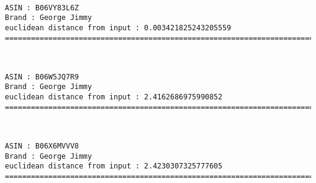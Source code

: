 \documentclass[11pt]{article}
\begin{document}
    
    
    \begin{center}
    \end{center}
    { \hspace*{\fill} \\}
    
    \begin{Verbatim}[commandchars=\\\{\}]
ASIN : B06VY83L6Z
Brand : George Jimmy
euclidean distance from input : 0.003421825243205559
=============================================================================================================================

    \end{Verbatim}

    
    
    \begin{center}
    \end{center}
    { \hspace*{\fill} \\}
    
    \begin{Verbatim}[commandchars=\\\{\}]
ASIN : B06W5JQ7R9
Brand : George Jimmy
euclidean distance from input : 2.4162686975990852
=============================================================================================================================

    \end{Verbatim}

    
    
    \begin{center}
    \end{center}
    { \hspace*{\fill} \\}
    
    \begin{Verbatim}[commandchars=\\\{\}]
ASIN : B06X6MVVV8
Brand : George Jimmy
euclidean distance from input : 2.4230307325777605
=============================================================================================================================

    \end{Verbatim}

    
    
\end{document}
